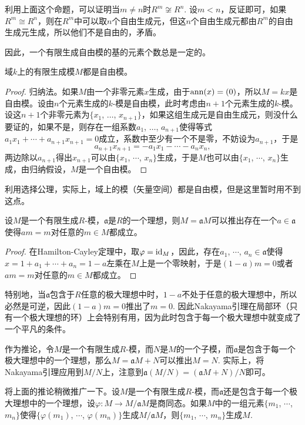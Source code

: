 利用上面这个命题，可以证明当$m\neq n$时$R^m\not\cong R^n$. 设$m<n$，反证即可，如果$R^m\cong R^n$，则在$R^m$中可以取$n$个自由生成元，但这$n$个自由生成元都由$R^m$的自由生成元生成，所以他们不是自由的，矛盾。

因此，一个有限生成自由模的基的元素个数总是一定的。

\begin{pro}
域$k$上的有限生成模$M$都是自由模。
\end{pro}

\begin{proof}
	归纳法。如果$M$由一个非零元素$x$生成，由于$\operatorname{ann}(x)=(0)$，所以$M=kx$是自由模。设由$n$个元素生成的$k$-模是自由模，此时考虑由$n+1$个元素生成的$k$-模。设这$n+1$个非零元素为$\{x_1$, $\dots$, $x_{n+1}\}$，如果这组生成元是自由生成元，则没什么要证的，如果不是，则存在一组系数$a_1$, $\dots$, $a_{n+1}$使得等式$a_1x_1+\cdots+a_{n+1}x_{n+1}=0$成立，系数中至少有一个不是零，不妨设为$a_{n+1}$，于是
	\[
	a_{n+1}x_{n+1}=-a_1x_1-\cdots-a_nx_n,
	\]
	两边除以$a_{n+1}$得出$x_{n+1}$可以由$\{x_1$, $\cdots$, $x_{n}\}$生成，于是$M$也可以由$\{x_1$, $\cdots$, $x_{n}\}$生成，由归纳假设，$M$是一个自由模。
\end{proof}

利用选择公理，实际上，域上的模（矢量空间）都是自由模，但是这里暂时用不到这点。

\begin{thm}[Nakayama引理]
设$M$是一个有限生成$R$-模，$\mathfrak{a}$是$R$的一个理想，则$M=\mathfrak{a}M$可以推出存在一个$a\in \mathfrak{a}$使得$am=m$对任意的$m\in M$都成立。
\end{thm}

\begin{proof}
	在Hamilton-Cayley定理中，取$\varphi=\operatorname{id}_M$，因此，存在$a_1$, $\cdots$, $a_n\in \mathfrak{a}$使得$x=1+a_1+\cdots+a_n=1-a$左乘在$M$上是一个零映射，于是$(1-a)m=0$或者$am=m$对任意的$m\in M$都成立。
\end{proof}

特别地，当$\mathfrak{a}$包含于$R$任意的极大理想中时，$1-a$不处于任意的极大理想中，所以必然是可逆，因此$(1-a)m=0$推出了$m=0$. 因此Nakayama引理在局部环（只有一个极大理想的环）上会特别有用，因为此时包含于每一个极大理想中就变成了一个平凡的条件。

作为推论，令$M$是一个有限生成$R$-模，而$N$是$M$的一个子模，而$\mathfrak{a}$是包含于每一个极大理想中的一个理想，那么$M=\mathfrak{a}M+N$可以推出$M=N$. 实际上，将Nakayama引理应用到$M/N$上，注意到$\mathfrak{a}(M/N)=(\mathfrak{a}M+N)/N$即可。

\begin{pro}
将上面的推论稍微推广一下。设$M$是一个有限生成$R$-模，而$\mathfrak{a}$还是包含于每一个极大理想中的一个理想，设$\varphi:M\to M/\mathfrak{a}M$是商同态。如果$M$中的一组元素$\{m_1$, $\cdots$, $m_n\}$使得$\{\varphi(m_1)$, $\cdots$, $\varphi(m_n)\}$生成$M/\mathfrak{a}M$，则$\{m_1$, $\cdots$, $m_n\}$生成$M$.
\end{pro}


